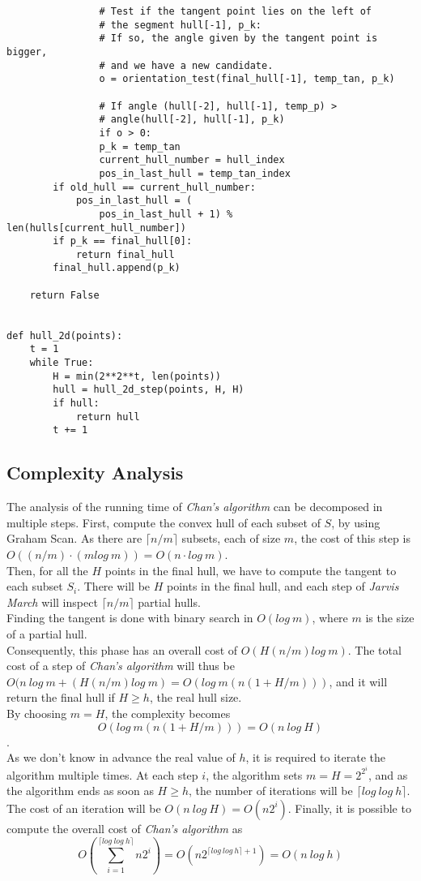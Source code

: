 \documentclass[
12pt,
a4paper,
oneside,
headinclude,
footinclude]{report}
\theoremstyle{definition} %
\begin{document}
\begin{verbatim}
				# Test if the tangent point lies on the left of 
				# the segment hull[-1], p_k:
				# If so, the angle given by the tangent point is bigger,
				# and we have a new candidate.
				o = orientation_test(final_hull[-1], temp_tan, p_k)
				
				# If angle (hull[-2], hull[-1], temp_p) > 
				# angle(hull[-2], hull[-1], p_k)
				if o > 0:
				p_k = temp_tan
				current_hull_number = hull_index
				pos_in_last_hull = temp_tan_index
		if old_hull == current_hull_number:
			pos_in_last_hull = (
				pos_in_last_hull + 1) % len(hulls[current_hull_number])
		if p_k == final_hull[0]:
			return final_hull
		final_hull.append(p_k)
	
	return False


def hull_2d(points):
	t = 1
	while True:
		H = min(2**2**t, len(points))
		hull = hull_2d_step(points, H, H)
		if hull:
			return hull
		t += 1
\end{verbatim}

\subsection{Complexity Analysis}
The analysis of the running time of \textit{Chan's algorithm} can be decomposed in multiple steps.
First, compute the convex hull of each subset of $S$, by using Graham Scan. As there are $\lceil n/m \rceil$ subsets, each of size $m$, the cost of this step is 
$O((n/m) \cdot (mlog\ m)) = O(n \cdot log\ m)$.\\
Then, for all the $H$ points in the final hull, we have to compute the tangent to each subset $S_i$. There will be $H$ points in the final hull, and each step of \textit{Jarvis March} will inspect $\lceil n/m \rceil$ partial hulls.\\
Finding the tangent is done with binary search in $O(log\ m)$, where $m$ is the size of a partial hull.\\
Consequently, this phase has an overall cost of $O(H(n/m)log\ m)$.
The total cost of a step of \textit{Chan's algorithm} will thus be $O(n\ log\ m + (H(n/m)log\ m) = O(log\ m(n(1 + H/m)))$, and it will return the final hull if $H \geq h$, the real hull size.\\
By choosing $m = H$, the complexity becomes 
$$ O(log\ m(n(1 + H/m))) = O(n\ log\ H)$$.\\
As we don't know in advance the real value of $h$, it is required to iterate the algorithm multiple times. At each step $i$, the algorithm sets $m = H = 2^{2^i}$, and as the algorithm ends as soon as $H \geq h$, the number of iterations will be $\lceil log\ log\ h\rceil$.\\
The cost of an iteration will be $O(n\ log\ H) = O(n2^i)$.
Finally, it is possible to compute the overall cost of \textit{Chan's algorithm} as
$$O\left(\sum_{i = 1}^{\lceil log\ log\ h\rceil}{n2^i}\right) = O(n2^{\lceil log\ log\ h\rceil + 1}) = O(n\ log\ h)$$
\end{document}
